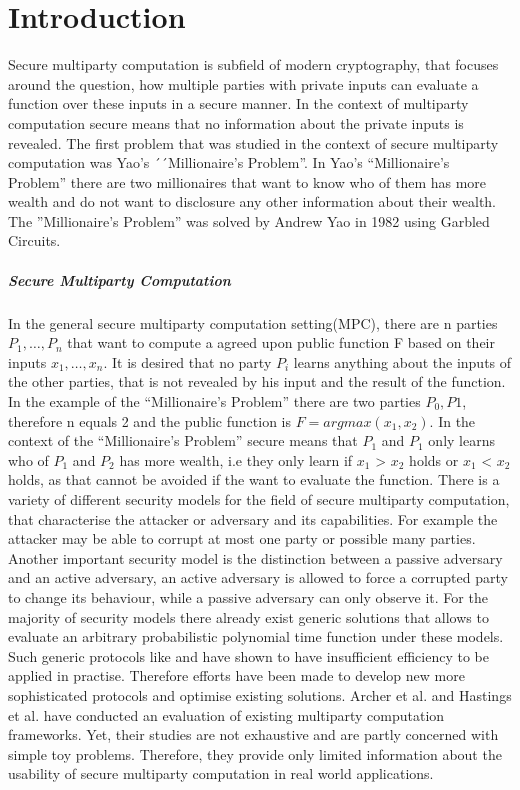 \chapter {Introduction}
Secure multiparty computation is subfield of modern cryptography, that focuses around the question, how multiple parties with private inputs can evaluate a function over these inputs in a secure manner. In the context of multiparty computation secure means that no information about the private inputs is revealed. The first problem that was studied in the context of secure multiparty computation was Yao's ´´Millionaire’s Problem''. In Yao's ``Millionaire’s Problem'' there are two millionaires that want to know who of them has more wealth and do not want to disclosure any other information about their wealth. The ''Millionaire’s Problem'' was solved by Andrew Yao in 1982 \cite{4568388} using Garbled Circuits.
\paragraph{Secure Multiparty Computation}
In the general secure multiparty computation setting(MPC), there are n parties $ P_1,\dots,P_{n} $ that want to compute a agreed upon public function F based on their inputs $ x_1,\dots,x_{n}$. It is desired that no party $P_i$ learns anything about the inputs of the other parties, that is not revealed by his input and the result of the function. In the example of the ``Millionaire’s Problem'' there are two parties $P_0,P1 $, therefore n equals 2 and the public function is $F=argmax(x_1,x_2)$. In the context of the ``Millionaire’s Problem'' secure means that $P_1$ and $P_1$ only learns who of $P_1$ and $P_2$ has more wealth, i.e they only learn if $x_1$ > $x_2$ holds or $x_1$ < $x_2$ holds, as that cannot be avoided if the want to evaluate the function. 
There is a variety of different security models for the field of secure multiparty computation, that characterise the attacker or adversary and its capabilities. For example the attacker may be able to corrupt at most one party or possible many parties. Another important security model is the distinction between a passive adversary and an active adversary, an active adversary is allowed to force a corrupted party to change its behaviour, while a passive adversary can only observe it. 
For the majority of security models there already exist generic solutions that allows to evaluate an arbitrary probabilistic polynomial time function under these models. Such generic protocols like \cite{DBLP:conf/crypto/WigdersonD82} and \cite{4568388} have shown to have insufficient efficiency to be applied in practise. Therefore efforts have been made to develop new more sophisticated protocols and optimise existing solutions.
Archer et al. \cite{Archer2018FromKT} and Hastings et al. \cite{hastings2019sok} have conducted an evaluation of existing multiparty computation frameworks. Yet, their studies are not exhaustive and are partly concerned with simple toy problems.
Therefore, they provide only limited information about the usability of secure multiparty computation in real world applications.  
